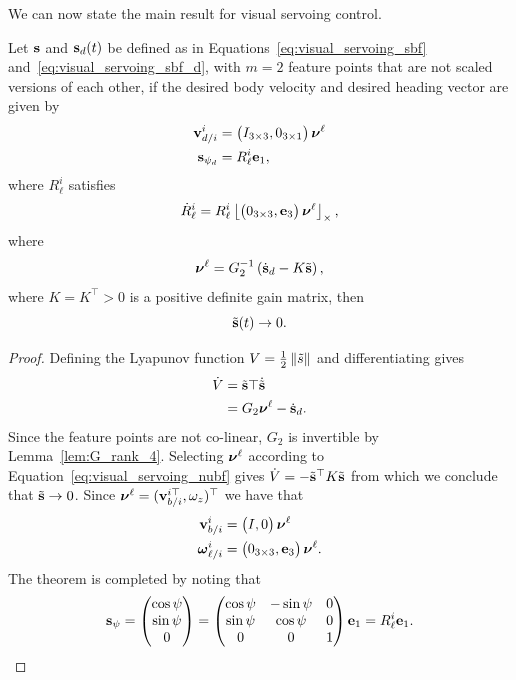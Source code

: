 We can now state the main result for visual servoing control.
\begin{theorem}
	Let $\mathbf{s}$ and $\mathbf{s}_d(t)$ be defined as in Equations~\eqref{eq:visual_servoing_sbf} and~\eqref{eq:visual_servoing_sbf_d}, with $m=2$ feature points that are not scaled versions of each other, if the desired body velocity and desired heading vector are given by
	\begin{align*}
	\mathbf{v}_{d/i}^i &= \begin{pmatrix} I_{3\times 3}, 0_{3\times 1} \end{pmatrix} \boldsymbol{\nu}^\ell \\
	\mathbf{s}_{\psi_d} &= R_\ell^i \mathbf{e}_1,
	\end{align*}
	where $R_\ell^i$ satisfies
	\[
	\dot{R}_\ell^i = R_\ell^i \left\lfloor \begin{pmatrix} 0_{3\times 3}, \mathbf{e}_3 \end{pmatrix}\boldsymbol{\nu}^\ell\right\rfloor_{\times},
	\]
	where
	\begin{equation}\label{eq:visual_servoing_nubf}
	\nubf^\ell = G_2^{-1}\left(\dot{\sbf}_d - K \tilde{\sbf}\right),
	\end{equation}
	where $K=K^\top>0$ is a positive definite gain matrix, then 
	\[
	\tilde{\mathbf{s}}(t) \to 0.
	\]
\end{theorem}
\begin{proof}
	Defining the Lyapunov function $V = \frac{1}{2}\left\|\tilde{s}\right\|$ and differentiating gives
	\begin{align*}
	\dot{V} &= \tilde{\mathbf{s}}\top\dot{\tilde{\mathbf{s}}} \\
			&= G_2\boldsymbol{\nu}^\ell - \dot{\mathbf{s}}_d.
	\end{align*}
	Since the feature points are not co-linear, $G_2$ is invertible by Lemma~\ref{lem:G_rank_4}.  
	Selecting $\boldsymbol{\nu}^\ell$ according to Equation~\eqref{eq:visual_servoing_nubf}
	gives $\dot{V} = -\tilde{\mathbf{s}}^\top K \tilde{\mathbf{s}}$ from which we conclude that $\tilde{\mathbf{s}}\to 0$.
	Since $\boldsymbol{\nu}^\ell = (\mathbf{v}_{b/i}^{i\top}, \omega_z)^\top$ we have that
	\begin{align*}
	\mathbf{v}_{b/i}^i &= \begin{pmatrix} I, 0 \end{pmatrix} \boldsymbol{\nu}^\ell \\
	\boldsymbol{\omega}_{\ell/i}^i &= \begin{pmatrix} 0_{3\times 3}, \mathbf{e}_3 \end{pmatrix}\boldsymbol{\nu}^\ell.
	\end{align*}
    The theorem is completed by noting that 
    \[
    \mathbf{s}_{\psi} = \begin{pmatrix}\cos\psi \\ \sin\psi \\ 0 \end{pmatrix} = \begin{pmatrix} \cos\psi & -\sin\psi & 0 \\ \sin\psi & \cos\psi & 0 \\ 0 & 0 & 1 \end{pmatrix}\mathbf{e}_1 = R_\ell^i \mathbf{e}_1.
    \]
\end{proof}

